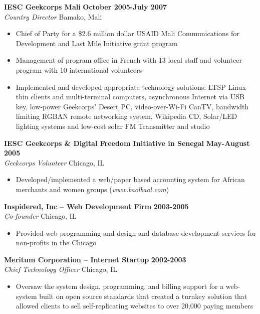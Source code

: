 \documentclass{res}
\begin{document}
\begin{resume}
\textbf{IESC Geekcorps Mali} \hfill        \textbf{October 2005-July 2007} \\
\emph{Country Director}       \hfill   Bamako, Mali
   \begin{itemize} \itemsep -2pt %
	\item Chief of Party for a \$2.6 million dollar USAID Mali Communications for Development and Last Mile Initiative grant program 
	\item Management of program office in French with 13 local staff and volunteer program with 10 international volunteers 
	\item Implemented and developed appropriate technology solutions: LTSP Linux thin clients and multi-terminal computers, 
asynchronous Internet via USB key, low-power Geekcorps’ Desert PC, video-over-Wi-Fi CanTV, bandwidth limiting RGBAN 
remote networking system, Wikipedia CD, Solar/LED lighting systems and low-cost solar FM Transmitter and studio
 \end{itemize} \vspace{-4pt}

\textbf{IESC Geekcorps \& Digital Freedom Initiative in Senegal} \hfill \textbf{May-August 2005} \\
\emph{Geekcorps Volunteer} \hfill Chicago, IL
 \begin{itemize} \itemsep -2pt
  \item  Developed/implemented a web/paper based accounting system for African merchants and women groups (\emph{www.baolbaol.com})
\end{itemize} \vspace{-6pt}

\textbf{Inspidered, Inc -- Web Development Firm} \hfill \textbf{2003-2005} \\
\emph{Co-founder} \hfill Chicago, IL
 \begin{itemize} \itemsep -2pt
  \item  Provided web programming and design and database development services for non-profits in the Chicago 
 \end{itemize} \vspace{-6pt}
 
\textbf{Meritum Corporation -- Internet Startup} \hfill \textbf{2002-2003} \\
\emph{Chief Technology Officer} \hfill Chicago, IL
 \begin{itemize} \itemsep -2pt
  \item Oversaw the system design, programming, and billing support for a web-system built on open source standards that created a 
	turnkey solution that allowed clients to sell self-replicating websites to over 20,000 paying members
\end{itemize} \vspace{-6pt}


\end{resume}
\end{document}
